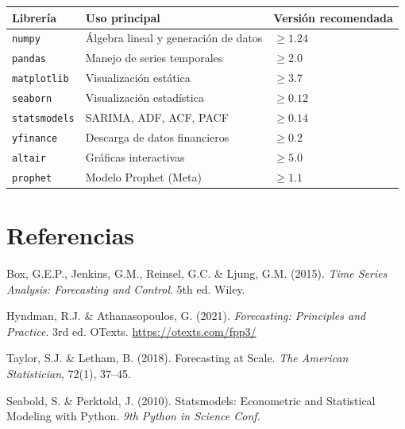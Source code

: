 \documentclass[12pt, a4paper]{article}
\begin{document}
\begin{center}
\renewcommand{\arraystretch}{1.4}
\begin{tabular}{lll}
  \toprule
  \textbf{Librería} & \textbf{Uso principal} & \textbf{Versión recomendada} \\
  \midrule
  \texttt{numpy}       & Álgebra lineal y generación de datos & $\geq 1.24$ \\
  \texttt{pandas}      & Manejo de series temporales & $\geq 2.0$ \\
  \texttt{matplotlib}  & Visualización estática & $\geq 3.7$ \\
  \texttt{seaborn}     & Visualización estadística & $\geq 0.12$ \\
  \texttt{statsmodels} & SARIMA, ADF, ACF, PACF & $\geq 0.14$ \\
  \texttt{yfinance}    & Descarga de datos financieros & $\geq 0.2$ \\
  \texttt{altair}      & Gráficas interactivas & $\geq 5.0$ \\
  \texttt{prophet}     & Modelo Prophet (Meta) & $\geq 1.1$ \\
  \bottomrule
\end{tabular}
\end{center}

\section*{Referencias}

\begin{enumerate}[label={[\arabic*]}]
  \item Box, G.E.P., Jenkins, G.M., Reinsel, G.C. \& Ljung, G.M. (2015).
        \textit{Time Series Analysis: Forecasting and Control}. 5th ed. Wiley.
  \item Hyndman, R.J. \& Athanasopoulos, G. (2021).
        \textit{Forecasting: Principles and Practice}. 3rd ed. OTexts.
        \url{https://otexts.com/fpp3/}
  \item Taylor, S.J. \& Letham, B. (2018). Forecasting at Scale.
        \textit{The American Statistician}, 72(1), 37--45.
  \item Seabold, S. \& Perktold, J. (2010). Statsmodels: Econometric and
        Statistical Modeling with Python. \textit{9th Python in Science Conf.}
\end{enumerate}
\end{document}
